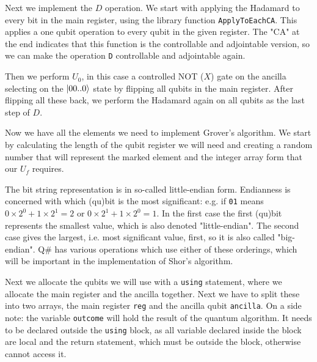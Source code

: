 


Next we implement the $D$ operation. We start with applying the Hadamard to every bit in the main register, using the library function \texttt{ApplyToEachCA}. This applies a one qubit operation to every qubit in the given register. The "CA" at the end indicates that this function is the controllable and adjointable version, so we can make the operation \texttt{D} controllable and adjointable again.

Then we perform $U_0$, in this case a controlled NOT ($X$) gate on the ancilla selecting on the $\left\vert{00..0}\right\rangle$ state by flipping all qubits in the main register. After flipping all these back, we perform the Hadamard again on all qubits as the last step of $D$.



Now we have all the elements we need to implement Grover's algorithm. We start by calculating the length of the qubit register we will need and creating a random number that will represent the marked element and the integer array form that our $U_f$ requires.

The bit string representation is in so-called little-endian form. Endianness is concerned with which (qu)bit is the most significant: e.g. if \texttt{01} means $0\times2^0+1\times2^1 = 2$ or $0\times2^1+1\times2^0 = 1$. In the first case the first (qu)bit represents the smallest value, which is also denoted "little-endian". The second case gives the largest, i.e. most significant value, first, so it is also called "big-endian". Q\# has various operations which use either of these orderings, which will be important in the implementation of Shor's algorithm.



Next we allocate the qubits we will use with a \texttt{using} statement, where we allocate the main register and the ancilla together. Next we have to split these into two arrays, the main register \texttt{reg} and the ancilla qubit \texttt{ancilla}.
On a side note: the variable \texttt{outcome} will hold the result of the quantum algorithm. It needs to be declared outside the \texttt{using} block, as all variable declared inside the block are local and the return statement, which must be outside the block, otherwise cannot access it.

